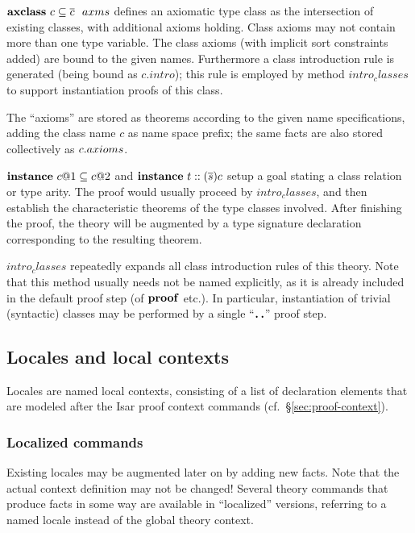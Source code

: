 \begin{descr}

\item [${\mathord{\mathbf{axclass}}}~c \subseteq \overline{c}~~axms$] defines an axiomatic type class as
  the intersection of existing classes, with additional axioms holding.  Class
  axioms may not contain more than one type variable.  The class axioms (with
  implicit sort constraints added) are bound to the given names.  Furthermore
  a class introduction rule is generated (being bound as $c{.}intro$); this
  rule is employed by method $intro_classes$ to support instantiation proofs
  of this class.

  The ``axioms'' are stored as theorems according to the given name
  specifications, adding the class name $c$ as name space prefix; the same
  facts are also stored collectively as $c{\mathord.}axioms$.

\item [${\mathord{\mathbf{instance}}}~c@1 \subseteq c@2$ and ${\mathord{\mathbf{instance}}}~t :: (\overline{s})c$] setup a
  goal stating a class relation or type arity.  The proof would usually
  proceed by $intro_classes$, and then establish the characteristic theorems
  of the type classes involved.  After finishing the proof, the theory will be
  augmented by a type signature declaration corresponding to the resulting
  theorem.

\item [$intro_classes$] repeatedly expands all class introduction rules of
  this theory.  Note that this method usually needs not be named explicitly,
  as it is already included in the default proof step (of ${\mathord{\mathbf{proof}}}$ etc.).
  In particular, instantiation of trivial (syntactic) classes may be performed
  by a single ``$\textbf{.\,.}$'' proof step.

\end{descr}


\subsection{Locales and local contexts}\label{sec:locale}

Locales are named local contexts, consisting of a list of declaration elements
that are modeled after the Isar proof context commands (cf.\
\S\ref{sec:proof-context}).

\subsubsection{Localized commands}

Existing locales may be augmented later on by adding new facts.  Note that the
actual context definition may not be changed!  Several theory commands that
produce facts in some way are available in ``localized'' versions, referring
to a named locale instead of the global theory context.

